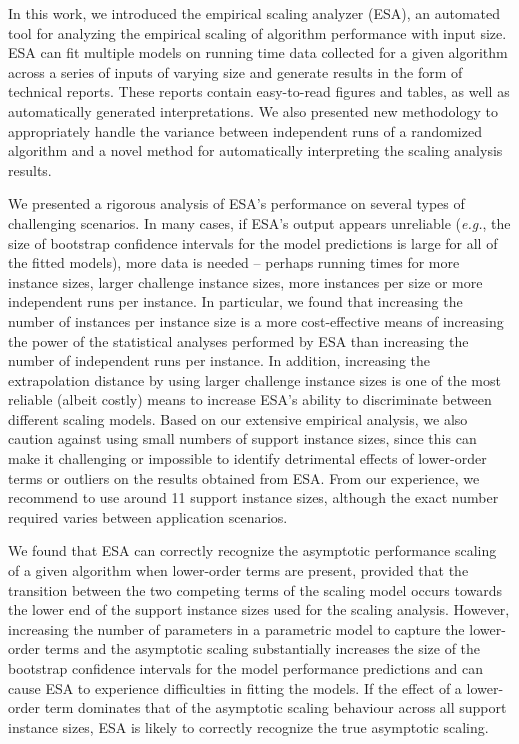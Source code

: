 \documentclass[aic]{iosart2x}
\newcommand{\eg}{\emph{e.g.}}
\begin{document}
In this work, we introduced the empirical scaling analyzer (ESA), an automated tool for analyzing the empirical scaling of algorithm performance with input size. 
ESA can fit multiple models on running time data collected for a given algorithm across a series of inputs of varying size and generate results in the form of technical reports. 
These reports contain easy-to-read figures and tables, as well as automatically generated interpretations. 
We also presented new methodology to appropriately handle the variance between independent runs of a randomized algorithm and a novel method for automatically interpreting the scaling analysis results.  

We presented a rigorous analysis of ESA's performance on several types of challenging scenarios. 
In many cases, if ESA's output appears unreliable (\eg{}, the size of bootstrap confidence intervals for the model predictions is large for all of the fitted models), more data is needed -- perhaps running times for more instance sizes, larger challenge instance sizes, more instances per size or more independent runs per instance. 
In particular, we found that increasing the number of instances per instance size is a more cost-effective means of increasing the power of the statistical analyses performed by ESA than increasing the number of independent runs per instance. 
In addition, increasing the extrapolation distance by using larger challenge instance sizes is one of the most reliable (albeit costly) means to increase ESA's ability to discriminate between different scaling models. 
Based on our extensive empirical analysis, we also caution against using small numbers of support instance sizes, since this can make it challenging or impossible to identify detrimental effects of lower-order terms or outliers on the results obtained from ESA.
From our experience, we recommend to use around 11 support instance sizes, although the exact number required varies between application scenarios. 

We found that ESA can correctly recognize the asymptotic performance scaling of a given algorithm when lower-order terms are present, provided that the transition between the two competing terms of the scaling model occurs towards the lower end of the support instance sizes used for the scaling analysis. 
However, increasing the number of parameters in a parametric model to capture the lower-order terms and the asymptotic scaling substantially increases the size of the bootstrap confidence intervals for the model performance predictions and can cause ESA to experience difficulties in fitting the models. 
If the effect of a lower-order term dominates that of the asymptotic scaling behaviour across all support instance sizes, ESA is likely to correctly recognize the true asymptotic scaling.
\end{document}

